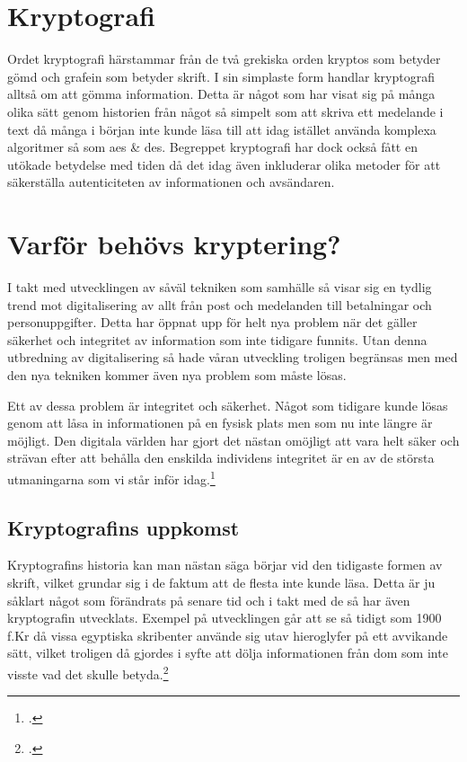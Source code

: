 
\section{Kryptografi} %
Ordet kryptografi härstammar från de två grekiska orden
kryptos som betyder gömd och grafein som betyder skrift.
I sin simplaste form handlar kryptografi alltså om att
gömma information. Detta är något som har visat sig på många
olika sätt genom historien från något så simpelt som att skriva
ett medelande i text då många i början inte kunde läsa till
att idag istället använda komplexa algoritmer så som \acrshort{aes} \& \acrshort{des}.
Begreppet kryptografi har dock också fått en utökade betydelse
med tiden då det idag även inkluderar olika metoder för att
säkerställa autenticiteten av informationen och avsändaren.

\section{Varför behövs kryptering?} %
\label{sec:varfor-behovs-kryptering}
I takt med utvecklingen av såväl tekniken som samhälle så visar sig en tydlig trend mot digitalisering av allt från
post och medelanden till betalningar och personuppgifter. Detta har öppnat upp för helt
nya problem när det gäller säkerhet och integritet av information som inte tidigare funnits. Utan denna utbredning av
digitalisering så hade våran utveckling troligen begränsas men med den nya tekniken kommer även nya problem
som måste lösas.

Ett av dessa problem är integritet och säkerhet. Något som tidigare kunde lösas genom att låsa in informationen på
en fysisk plats men som nu inte längre är möjligt. Den digitala världen har gjort det nästan
omöjligt att vara helt säker och strävan efter att behålla den enskilda individens integritet
är en av de största utmaningarna som vi står inför idag.\footcite{diffie2010privacy}

\subsection{Kryptografins uppkomst} %
Kryptografins historia kan man nästan säga börjar vid den
tidigaste formen av skrift, vilket grundar sig i de faktum att
de flesta inte kunde läsa. Detta är ju såklart något som förändrats
på senare tid och i takt med de så har även kryptografin utvecklats.
Exempel på utvecklingen går att se så tidigt som 1900 f.Kr då vissa egyptiska
skribenter använde sig utav hieroglyfer på ett avvikande sätt, vilket
troligen då gjordes i syfte att dölja informationen från dom som inte
visste vad det skulle betyda.\footcite{kryptografi-historia-1}

